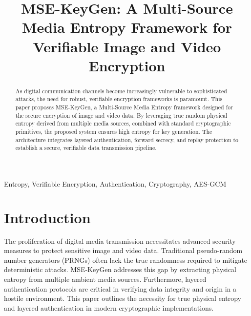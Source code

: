 \documentclass[conference]{IEEEtran}
\begin{document}
\title{MSE-KeyGen: A Multi-Source Media Entropy Framework for Verifiable Image and Video Encryption}

\author{
\and
{}
\and
{}
}

\maketitle

\begin{abstract}
As digital communication channels become increasingly vulnerable to sophisticated attacks, the need for robust, verifiable encryption frameworks is paramount. This paper proposes MSE-KeyGen, a Multi-Source Media Entropy framework designed for the secure encryption of image and video data. By leveraging true random physical entropy derived from multiple media sources, combined with standard cryptographic primitives, the proposed system ensures high entropy for key generation. The architecture integrates layered authentication, forward secrecy, and replay protection to establish a secure, verifiable data transmission pipeline.
\end{abstract}

\begin{IEEEkeywords}
Entropy, Verifiable Encryption, Authentication, Cryptography, AES-GCM
\end{IEEEkeywords}

\section{Introduction}
The proliferation of digital media transmission necessitates advanced security measures to protect sensitive image and video data. Traditional pseudo-random number generators (PRNGs) often lack the true randomness required to mitigate deterministic attacks. MSE-KeyGen addresses this gap by extracting physical entropy from multiple ambient media sources. Furthermore, layered authentication protocols are critical in verifying data integrity and origin in a hostile environment. This paper outlines the necessity for true physical entropy and layered authentication in modern cryptographic implementations.
\end{document}
